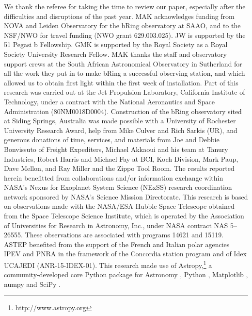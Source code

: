 \documentclass[longauth]{aa} %
\begin{document}
\begin{acknowledgements}

  We thank the referee for taking the time to review our paper, especially after the difficulties and disruptions of the past year.
  MAK acknowledges funding from NOVA and Leiden Observatory for the bRing observatory at SAAO, and to the NSF/NWO for travel funding (NWO grant 629.003.025).
  JW is supported by the 51 Pegasi b Fellowship.
GMK is supported by the Royal Society as a Royal Society University Research Fellow.
  MAK thanks the staff and observatory support crews at the South African Astronomical Observatory in Sutherland for all the work they put in to make bRing a successful observing station, and which allowed us to obtain first light within the first week of installation.
  Part of this research was carried out at the Jet Propulsion Laboratory, California Institute of Technology, under a contract with the National Aeronautics and Space Administration (80NM0018D0004).
%
Construction of the bRing observatory sited at Siding Springs, Australia was made possible with a University of Rochester University Research Award, help from Mike Culver and Rich Sarkis (UR), and generous donations of time, services, and materials from Joe and Debbie Bonvissuto of Freight Expediters, Michael Akkaoui and his team at Tanury Industries, Robert Harris and Michael Fay at BCI, Koch Division, Mark Paup, Dave Mellon, and Ray Miller and the Zippo Tool Room.
%
The results reported herein benefitted from collaborations and/or information exchange within NASA’s Nexus for Exoplanet System Science (NExSS) research coordination network sponsored by NASA’s Science Mission Directorate.
  This research is based on observations made with the NASA/ESA Hubble Space Telescope obtained from the Space Telescope Science Institute, which is operated by the Association of Universities for Research in Astronomy, Inc., under NASA contract NAS 5–26555. These observations are associated with programs 14621 and 15119.
%
ASTEP benefited from the support of the French and Italian polar agencies IPEV and PNRA in the framework of the Concordia station program and of Idex UCAJEDI (ANR-15-IDEX-01).
%
This research made use of Astropy,\footnote{http://www.astropy.org} a community-developed core Python package for Astronomy \citep{astropy:2013, astropy:2018}, Python \citep{vanRossum95,Oliphant07}, Matplotlib \citep{Hunter07,Caswell20},
numpy \citep{Oliphant06,vanderWalt11} and SciPy \citep{Virtanen20,Virtanen20B}.

\end{acknowledgements}





\newpage
\end{document}
